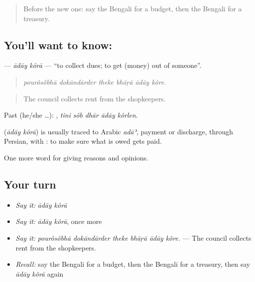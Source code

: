 \begin{quote}
Before the new one: say the Bengali for a budget, then the Bengali for a treasury.
\end{quote}

\subsection*{You'll want to know:  }
\textbf{ } — \emph{ādāy kôrā} — \textquotedblleft{}to collect dues; to get (money) out of someone\textquotedblright{}.

\begin{quote}
     
\end{quote}

\begin{quote}
\emph{pourôsôbhā dokāndārder theke bhāṛā ādāy kôre.}
\end{quote}

\begin{quote}
The council collects rent from the shopkeepers.
\end{quote}

Past (he/she …):     , \emph{tini sôb dhār ādāy kôrlen}.

\begin{cousinweb}
\textbf{ } (\emph{ādāy kôrā}) is usually traced to Arabic \emph{adāʾ}, payment or discharge, through Persian, with : to make sure what is owed gets paid.
\end{cousinweb}

\begin{grammarlens}[title={What you've built}]
One more word for giving reasons and opinions.
\end{grammarlens}

\subsection*{Your turn}
\begin{itemize}
\raggedright
  \item \emph{Say it:} \emph{ādāy kôrā}
  \item \emph{Say it:} \emph{ādāy kôrā}, once more
  \item \emph{Say it:} \emph{pourôsôbhā dokāndārder theke bhāṛā ādāy kôre.} — The council collects rent from the shopkeepers.
  \item \emph{Recall:} say the Bengali for a budget, then the Bengali for a treasury, then say \emph{ādāy kôrā} again
\end{itemize}

